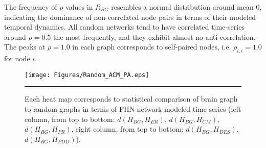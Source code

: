 The frequency of $\rho$ values in $R_{BG}$ resembles a normal distribution around mean 0, indicating the dominance of non-correlated node pairs in terms of their modeled temporal dynamics. All random networks tend to have correlated time-series around $\rho=0.5$ the most frequently, and they exhibit almost no anti-correlation. The peaks at $\rho =1.0$ in each graph corresponds to self-paired nodes, i.e. $\rho_{i,i}=1.0$ for node $i$.  



\begin{figure}[htbp]
 
  \centering

	 \texttt{[image: Figures/Random\_ACM\_PA.eps]}

	  \rule{35em}{0.5pt}  
  \caption[Random Graph Comparison, ACM]{ Each heat map corresponds to statistical comparison of brain graph to random graphs in terms of FHN network modeled time-series (left column, from top to bottom: $d(H_{BG}, H_{ER})$, $d(H_{BG}, H_{CM})$, $d(H_{BG}, H_{PR})$, right column, from top to bottom: $d(H_{BG}, H_{DES})$, $d(H_{BG}, H_{PDD})$). }
    \label{fig:Random Graph Comparison, ACM}
 	
\end{figure}  





